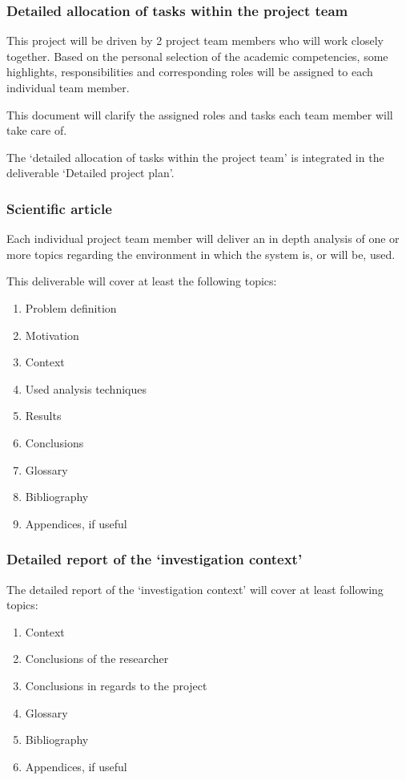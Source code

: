 \subsubsection{Detailed allocation of tasks within the project team}
This project will be driven by 2 project team members who will work closely together.
Based on the personal selection of the  academic competencies, some highlights, responsibilities and corresponding roles will be assigned to each individual team member.

This document will clarify the assigned roles and tasks each team member will take care of.

The `detailed allocation of tasks within the project team' is integrated in the deliverable `Detailed project plan'.

\subsubsection{Scientific article}
Each individual project team member will deliver an in depth analysis of one or more topics regarding the environment in which the system is, or will be, used.

This deliverable will cover at least the following topics:

	\begin{enumerate}
		\item Problem definition
		\item Motivation
		\item Context
		\item Used analysis techniques
		\item Results
		\item Conclusions
		\item Glossary
		\item Bibliography
		\item Appendices, if useful
	\end {enumerate}

\subsubsection{Detailed report of the `investigation context'}
The detailed report of the `investigation context' will cover at least following topics:

	\begin{enumerate}
		\item Context
		\item Conclusions of the researcher
		\item Conclusions in regards to the project
		\item Glossary
		\item Bibliography
		\item Appendices, if useful
	\end {enumerate}

